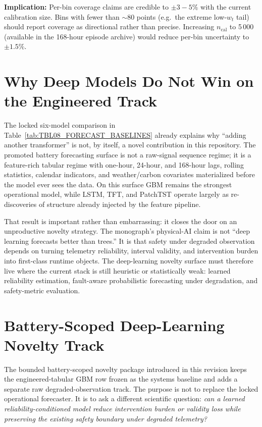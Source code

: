\textbf{Implication:}  Per-bin coverage claims are credible to
$\pm 3{-}5\%$ with the current calibration size.  Bins with fewer
than $\sim\!80$ points (e.g.\ the extreme low-$w_t$ tail) should
report coverage as directional rather than precise.  Increasing
$n_{\mathrm{cal}}$ to 5\,000 (available in the 168-hour episode
archive) would reduce per-bin uncertainty to $\pm 1.5\%$.

\section{Why Deep Models Do Not Win on the Engineered Track}
\label{sec:deep-on-engineered-track}

The locked six-model comparison in Table~\ref{tab:TBL08_FORECAST_BASELINES}
already explains why ``adding another transformer'' is not, by itself, a
novel contribution in this repository.  The promoted battery forecasting
surface is not a raw-signal sequence regime; it is a feature-rich tabular
regime with one-hour, 24-hour, and 168-hour lags, rolling statistics,
calendar indicators, and weather/carbon covariates materialized before the
model ever sees the data.  On this surface GBM remains the strongest
operational model, while LSTM, TFT, and PatchTST operate largely as
re-discoveries of structure already injected by the feature pipeline.

That result is important rather than embarrassing: it closes the door on an
unproductive novelty strategy.  The monograph's physical-AI claim is not
``deep learning forecasts better than trees.''  It is that safety under
degraded observation depends on turning telemetry reliability, interval
validity, and intervention burden into first-class runtime objects.  The
deep-learning novelty surface must therefore live where the current stack is
still heuristic or statistically weak: learned reliability estimation,
fault-aware probabilistic forecasting under degradation, and safety-metric
evaluation.

\section{Battery-Scoped Deep-Learning Novelty Track}
\label{sec:battery-dl-novelty}

The bounded battery-scoped novelty package introduced in this revision keeps
the engineered-tabular GBM row frozen as the systems baseline and adds a
separate raw degraded-observation track.  The purpose is not to replace the
locked operational forecaster.  It is to ask a different scientific question:
\emph{can a learned reliability-conditioned model reduce intervention burden
or validity loss while preserving the existing safety boundary under degraded
telemetry?}

